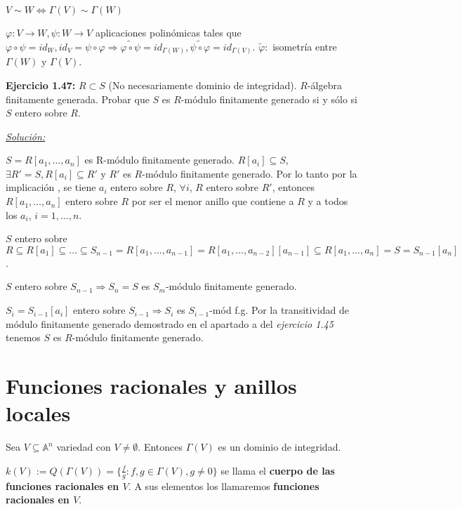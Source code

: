 \begin{Cor}
$V\sim W \Leftrightarrow \Gamma(V)\sim \Gamma(W)$
\end{Cor}

\begin{Dem}
$\varphi: V\rightarrow W, \psi: W\rightarrow V$ aplicaciones polinómicas tales que $\varphi\circ \psi = id_W, id_V = \psi \circ \varphi \Rightarrow \tilde{\varphi\circ \psi} = id_{\Gamma (W)}, \tilde{\psi\circ \varphi}=id_{\Gamma (V)}$. $\tilde{\varphi}:$ isometría entre $\Gamma(W)$ y $\Gamma (V)$.
\end{Dem}

\textbf{Ejercicio 1.47:} $R\subset S$ (No necesariamente dominio de integridad). $R$-álgebra finitamente generada. Probar que $S$ es $R$-módulo finitamente generado si y sólo si $S$ entero sobre $R$.
\vspace{1mm}


\underline{\textit{Solución: }}

\framebox{$\Rightarrow $} $S=R[a_1,\dots,a_n]$ es R-módulo finitamente generado. $R[a_i]\subseteq S$, $\exists R'=S, R[a_i]\subseteq R'$ y $R'$ es $R$-módulo finitamente generado. Por lo tanto por la implicación , se tiene $a_i$ entero sobre $R$, $\forall i$, $R$ entero sobre $R'$, entonces $R[a_1,\dots,a_n]$ entero sobre $R$ por ser el menor anillo que contiene a $R$ y a todos los $a_i$, $i=1,\dots,n$.

\framebox{$\Leftarrow $} $S$ entero sobre $R\subseteq R[a_1]\subseteq \dots \subseteq S_{n-1}=R[a_1,\dots,a_{n-1}]=R[a_1,\dots,a_{n-2}][a_{n-1}]\subseteq R[a_1,\dots,a_n]= S =S_{n-1}[a_n]$.

$S$ entero sobre $S_{n-1} \Rightarrow S_n=S$ es $S_m$-módulo finitamente generado.

$S_i=S_{i-1}[a_i]$ entero sobre $S_{i-1}\Rightarrow S_i$ es $S_{i-1}$-mód f.g. Por la transitividad de módulo finitamente generado demostrado en el apartado a del \textit{ejercicio 1.45} tenemos $S$ es $R$-módulo finitamente generado.


\section{Funciones racionales y anillos locales}

Sea $V\subseteq \mathbb{A}^n$ variedad con $V\neq \emptyset $. Entonces $\Gamma(V)$ es un dominio de integridad.

\begin{Def}
$k(V):=Q(\Gamma(V))=\{\frac{f}{g} : f,g\in \Gamma(V),g\neq 0 \}$ se llama el \textbf{cuerpo de las funciones racionales en $V$}. A sus elementos los llamaremos \textbf{funciones racionales en $V$}.
\end{Def}

